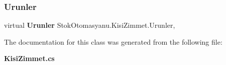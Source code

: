 \mbox{\label{class_stok_otomasyanu_1_1_kisi_zimmet_ae25b1cbf289c8cfeae8d6427b355a616}} 
\subsubsection{Urunler}
{\footnotesize\ttfamily virtual \textbf{ Urunler} Stok\+Otomasyanu.\+Kisi\+Zimmet.\+Urunler\hspace{0.3cm}{\ttfamily [get]}, {\ttfamily [set]}}



The documentation for this class was generated from the following file\+:\begin{DoxyCompactItemize}
\item 
\textbf{ Kisi\+Zimmet.\+cs}\end{DoxyCompactItemize}
